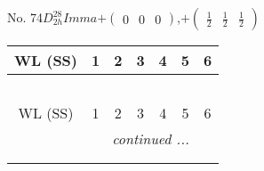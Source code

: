 \documentclass[fleqn,9pt,landscape]{jsarticle}
\begin{document}
\newpage
No. 74\quad$D_{2h}^{28}$\quad$Imma$\quad[ orthorhombic ]\quad$+\begin{pmatrix} 0 & 0 & 0 \end{pmatrix}$,\quad $+\begin{pmatrix} \frac{1}{2} & \frac{1}{2} & \frac{1}{2} \end{pmatrix}$
\begin{center}
\renewcommand{\arraystretch}{1.2}
\begin{longtable}{ccccccc}
 \hline \hline
WL (SS) & 1 & 2 & 3 & 4 & 5 & 6 \\ \hline \endfirsthead

\multicolumn{6}{l}{\tablename\ \thetable{}} \\
 \hline \hline
WL (SS) & 1 & 2 & 3 & 4 & 5 & 6 \\ \hline \endhead

 \hline \hline
\multicolumn{6}{r}{\footnotesize\it continued ...} \\ \endfoot

 \hline \hline
\multicolumn{6}{r}{} \\ \endlastfoot


\end{longtable}
\end{center}
\end{document}
